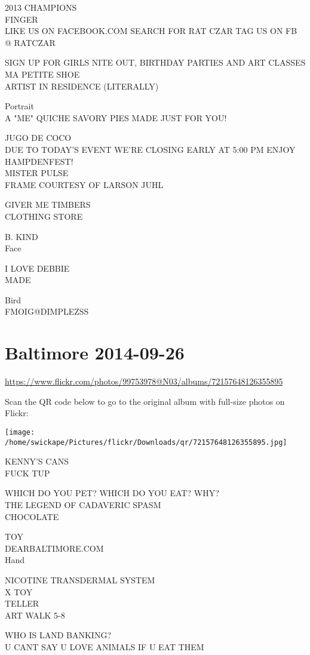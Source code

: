 \documentclass[10pt,letterpaper]{article}
\begin{document}
2013 CHAMPIONS\\
FINGER\\
LIKE US ON FACEBOOK.COM SEARCH FOR RAT CZAR TAG US ON FB @ RATCZAR

SIGN UP FOR GIRLS NITE OUT, BIRTHDAY PARTIES AND ART CLASSES\\
MA PETITE SHOE\\
ARTIST IN RESIDENCE (LITERALLY)

Portrait\\
A "ME" QUICHE SAVORY PIES MADE JUST FOR YOU!

JUGO DE COCO\\
DUE TO TODAY'S EVENT WE'RE CLOSING EARLY AT 5:00 PM ENJOY HAMPDENFEST!\\
MISTER PULSE\\
FRAME COURTESY OF LARSON JUHL

GIVER ME TIMBERS\\
CLOTHING STORE

B. KIND\\
Face

I LOVE DEBBIE\\
MADE

Bird\\
FMOIG@DIMPLEZSS


\section*{Baltimore 2014-09-26}

\url{https://www.flickr.com/photos/99753978@N03/albums/72157648126355895}

Scan the QR code below to go to the original album with full-size photos on Flickr:

\texttt{[image: /home/swickape/Pictures/flickr/Downloads/qr/72157648126355895.jpg]}


KENNY'S CANS\\
FUCK TUP

WHICH DO YOU PET?  WHICH DO YOU EAT?  WHY?\\
THE LEGEND OF CADAVERIC SPASM\\
CHOCOLATE

TOY\\
DEARBALTIMORE.COM\\
Hand

NICOTINE TRANSDERMAL SYSTEM\\
X TOY\\
TELLER\\
ART WALK 5{-}8

WHO IS LAND BANKING?\\
U CANT SAY U LOVE ANIMALS IF U EAT THEM
\end{document}
